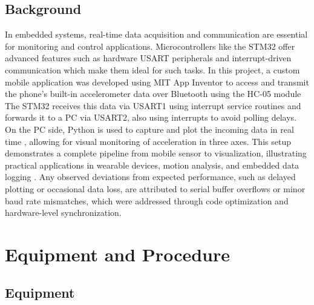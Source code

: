 \documentclass[A4paper,12pt]{extreport}
\begin{document}
\section{Background}
In embedded systems, real-time data acquisition and communication are essential for monitoring and control applications. Microcontrollers like the STM32 offer advanced features such as hardware USART peripherals and interrupt-driven communication which make them ideal for such tasks. In this project, a custom mobile application was developed using MIT App Inventor  to access and transmit the phone’s built-in accelerometer data over Bluetooth using the HC-05 module \cite{hc05datasheet}  The STM32 receives this data via USART1 using interrupt service routines  and forwards it to a PC via USART2, also using interrupts to avoid polling delays. On the PC side, Python is used to capture and plot the incoming data in real time , allowing for visual monitoring of acceleration in three axes. This setup demonstrates a complete pipeline from mobile sensor to visualization,\cite{pyserial} illustrating practical applications in wearable devices, motion analysis, and embedded data logging . Any observed deviations from expected performance, such as delayed plotting or occasional data loss, are attributed to serial buffer overflows or minor baud rate mismatches, which were addressed through code optimization and hardware-level synchronization.

\pagebreak



 

\chapter{Equipment and Procedure}\label{ch:equip_proc}
\section{Equipment}
\end{document}
